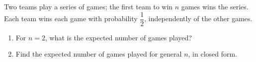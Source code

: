 Two teams play a series of games; the first team to win $n$ games wins the series. Each team wins each game with probability $\dfrac{1}{2}$, independently of the other games.
\begin{enumerate}
\item[(a)] For $n=2$, what is the expected number of games played?
\item[(b)] Find the expected number of games played for general $n$, in closed form.
\end{enumerate}

